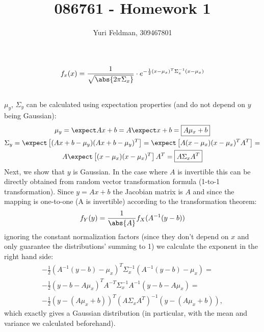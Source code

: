 \documentclass[a4paper]{scrreprt}
\title{086761 - Homework 1}
\author{Yuri Feldman, 309467801}
\begin{document}
\maketitle
\chapter{}
\section{}
\begin{gather}
	f_x(x) = \frac{1}{\sqrt{\abs{2\pi\Sigma_x}}} \cdot 
	e^{-\frac{1}{2}(x-\mu_x)^T\Sigma_x^{-1} (x-\mu_x)}
\end{gather}
\section{}
$\mu_y$, $\Sigma_y$ can be calculated using expectation properties (and do not 
depend on $y$ being Gaussian):
\begin{gather}
	\mu_y = \expect Ax + b = A\expect x + b = \boxed{A\mu_x + b} \\
	\Sigma_y = \expect\left[ (Ax+b-\mu_y)(Ax+b-\mu_y)^T\right] = 
	\expect\left[ A(x-\mu_x)(x-\mu_x)^T A^T \right] = \\
	A\expect\left[ 
	(x-\mu_x)(x-\mu_x)^T\right] A^T = \boxed{A\Sigma_x A^T}
\end{gather}
Next, we show that $y$ is Gaussian. In the case where $A$ is invertible this 
can be directly obtained from random vector transformation formula (1-to-1 
transformation). Since $y=Ax+b$ the Jacobian matrix is $A$ and since the 
mapping is one-to-one (A is invertible) according to the transformation 
theorem: 
\begin{gather}
	f_Y(y) = \frac{1}{\abs{A}} f_X(A^{-1}(y-b))
\end{gather}
ignoring the constant normalization factors (since they don't depend on $x$ and 
only guarantee the distributions' summing to 1) we calculate the exponent in 
the 
right hand side: 
\begin{gather}
	-\frac{1}{2}\left(A^{-1}(y-b)-\mu_x\right)^T\Sigma_x^{-1}\left(A^{-1}(y-b)-\mu_x\right)
	 = \\
	-\frac{1}{2}\left(y-b-A\mu_x\right)^TA^{-T}\Sigma_x^{-1}A^{-1}\left(y-b-A\mu_x\right)
	 = \\
		-\frac{1}{2}\left(y-(A\mu_x+b)\right)^T\left(A\Sigma_xA^T\right)^{-1}\left(y-(A\mu_x+b)\right),
\end{gather}
which exactly gives a Gaussian distribution (in particular, with the mean and 
variance we calculated beforehand). 
\end{document}
